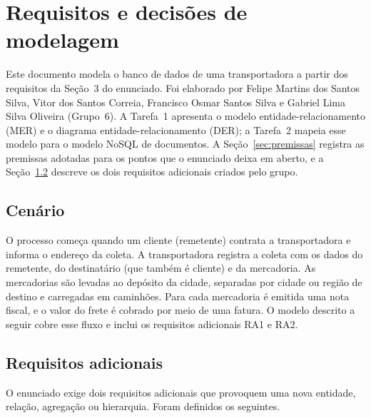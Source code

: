 \section{Requisitos e decisões de modelagem}

Este documento modela o banco de dados de uma transportadora a partir dos requisitos da Seção~3 do enunciado. Foi elaborado por Felipe Martins dos Santos Silva, Vitor dos Santos Correia, Francisco Osmar Santos Silva e Gabriel Lima Silva Oliveira (Grupo~6). A Tarefa~1 apresenta o modelo entidade-relacionamento (MER) e o diagrama entidade-relacionamento (DER); a Tarefa~2 mapeia esse modelo para o modelo NoSQL de documentos. A Seção~\ref{sec:premissas} registra as premissas adotadas para os pontos que o enunciado deixa em aberto, e a Seção~\ref{sec:adicionais} descreve os dois requisitos adicionais criados pelo grupo.

\subsection{Cenário}

O processo começa quando um cliente (remetente) contrata a transportadora e informa o endereço da coleta. A transportadora registra a coleta com os dados do remetente, do destinatário (que também é cliente) e da mercadoria. As mercadorias são levadas ao depósito da cidade, separadas por cidade ou região de destino e carregadas em caminhões. Para cada mercadoria é emitida uma nota fiscal, e o valor do frete é cobrado por meio de uma fatura. O modelo descrito a seguir cobre esse fluxo e inclui os requisitos adicionais RA1 e RA2.

\subsection{Requisitos adicionais}
\label{sec:adicionais}

O enunciado exige dois requisitos adicionais que provoquem uma nova entidade, relação, agregação ou hierarquia. Foram definidos os seguintes.

